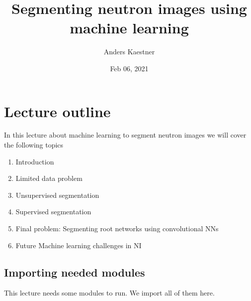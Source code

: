 \documentclass[letterpaper,10pt,english]{sphinxmanual}
\title{Segmenting neutron images using machine learning}
\date{Feb 06, 2021}
\author{Anders Kaestner}
\begin{document}
\pagestyle{empty}
\sphinxmaketitle
\pagestyle{plain}
\sphinxtableofcontents
\pagestyle{normal}
\label{\detokenize{ML4NeutronImageSegmentation::doc}}





\chapter{Lecture outline}
\label{\detokenize{ML4NeutronImageSegmentation:lecture-outline}}
In this lecture about machine learning to segment neutron images we will cover the following topics
\begin{enumerate}
%
\item {} 
Introduction

\item {} 
Limited data problem

\item {} 
Unsupervised segmentation

\item {} 
Supervised segmentation

\item {} 
Final problem: Segmenting root networks using convolutional NNs

\item {} 
Future Machine learning challenges in NI

\end{enumerate}


\section{Importing needed modules}
\label{\detokenize{ML4NeutronImageSegmentation:importing-needed-modules}}
This lecture needs some modules to run. We import all of them here.
\end{document}
